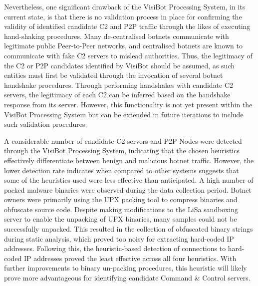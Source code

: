 Nevertheless, one significant drawback of the VisiBot Processing System, in its current state, is that there is no validation process in place for confirming the validity of identified candidate C2 and P2P traffic through the likes of executing hand-shaking procedures. Many de-centralised botnets communicate with legitimate public Peer-to-Peer networks, and centralised botnets are known to communicate with fake C2 servers to mislead authorities. Thus, the legitimacy of the C2 or P2P candidates identified by VisiBot should be assumed, as such entities must first be validated through the invocation of several botnet handshake procedures. Through performing handshakes with candidate C2 servers, the legitimacy of each C2 can be inferred based on the handshake response from its server. However, this functionality is not yet present within the VisiBot Processing System but can be extended in future iterations to include such validation procedures.

A considerable number of candidate C2 servers and P2P Nodes were detected through the VisiBot Processing System, indicating that the chosen heuristics effectively differentiate between benign and malicious botnet traffic. However, the lower detection rate indicates when compared to other systems suggests that some of the heuristics used were less effective than anticipated. A high number of packed malware binaries were observed during the data collection period. Botnet owners were primarily using the UPX packing tool \citep{UPX} to compress binaries and obfuscate source code. Despite making modifications to the LiSa sandboxing server to enable the unpacking of UPX binaries, many samples could not be successfully unpacked. This resulted in the collection of obfuscated binary strings during static analysis, which proved too noisy for extracting hard-coded IP addresses. Following this, the heuristic-based detection of connections to hard-coded IP addresses proved the least effective across all four heuristics. With further improvements to binary un-packing procedures, this heuristic will likely prove more advantageous for identifying candidate Command \& Control servers.

